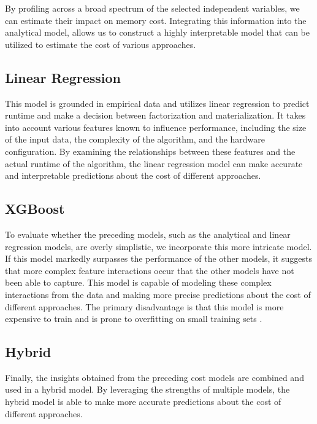 By profiling across a broad spectrum of the selected independent variables, we can estimate their impact on memory cost. Integrating this information into the analytical model, allows us to construct a highly interpretable model that can be utilized to estimate the cost of various approaches.

\subsection{Linear Regression}
This model is grounded in empirical data and utilizes linear regression to predict runtime and make a decision between factorization and materialization. It takes into account various features known to influence performance, including the size of the input data, the complexity of the algorithm, and the hardware configuration. By examining the relationships between these features and the actual runtime of the algorithm, the linear regression model can make accurate and interpretable predictions about the cost of different approaches.

\subsection{XGBoost}
To evaluate whether the preceding models, such as the analytical and linear regression models, are overly simplistic, we incorporate this more intricate model. If this model markedly surpasses the performance of the other models, it suggests that more complex feature interactions occur that the other models have not been able to capture. This model is capable of modeling these complex interactions from the data and making more precise predictions about the cost of different approaches. The primary disadvantage is that this model is more expensive to train and is prone to overfitting on small training sets \cite{xgboost}.

\subsection{Hybrid}
Finally, the insights obtained from the preceding cost models are combined and used in a hybrid model. By leveraging the strengths of multiple models, the hybrid model is able to make more accurate predictions about the cost of different approaches.